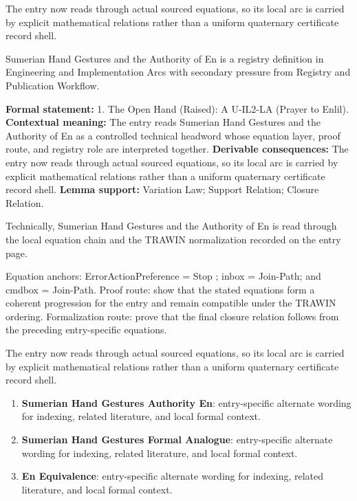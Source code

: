 The entry now reads through actual sourced equations, so its local arc is carried by explicit mathematical relations rather than a uniform quaternary certificate record shell.
\clearpage


\begingroup\small
{}
Sumerian Hand Gestures and the Authority of En is a registry definition in Engineering and Implementation Arcs with secondary pressure from Registry and Publication Workflow.

\begingroup\footnotesize\setlength{\emergencystretch}{3em}\sloppy
\textbf{Formal statement:} 1. The Open Hand (Raised): A U-IL2-LA (Prayer to Enlil). \textbf{Contextual meaning:} The entry reads Sumerian Hand Gestures and the Authority of En as a controlled technical headword whose equation layer, proof route, and registry role are interpreted together. \textbf{Derivable consequences:} The entry now reads through actual sourced equations, so its local arc is carried by explicit mathematical relations rather than a uniform quaternary certificate record shell. \textbf{Lemma support:} Variation Law; Support Relation; Closure Relation.\par
\endgroup

Technically, Sumerian Hand Gestures and the Authority of En is read through the local equation chain and the TRAWIN normalization recorded on the entry page.

Equation anchors: ErrorActionPreference = Stop ; inbox = Join-Path; and cmdbox = Join-Path. Proof route: show that the stated equations form a coherent progression for the entry and remain compatible under the TRAWIN ordering. Formalization route: prove that the final closure relation follows from the preceding entry-specific equations.

The entry now reads through actual sourced equations, so its local arc is carried by explicit mathematical relations rather than a uniform quaternary certificate record shell.
\endgroup

\begin{enumerate}[leftmargin=1.6em,itemsep=6pt,topsep=4pt]
\item \textbf{Sumerian Hand Gestures Authority En}: entry-specific alternate wording for indexing, related literature, and local formal context.
\item \textbf{Sumerian Hand Gestures Formal Analogue}: entry-specific alternate wording for indexing, related literature, and local formal context.
\item \textbf{En Equivalence}: entry-specific alternate wording for indexing, related literature, and local formal context.
\end{enumerate}

